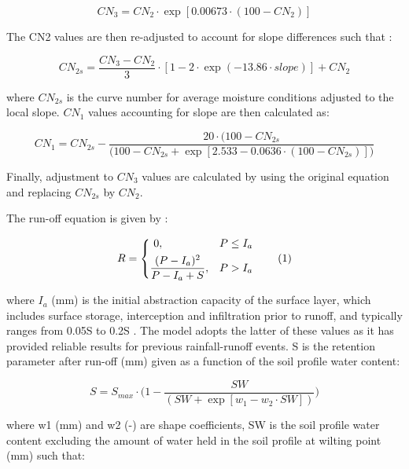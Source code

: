 \documentclass[]{article}
\begin{document}
\begin{equation}  
CN_3 = CN_2 \cdot \exp [0.00673 \cdot (100-CN_2)] 
\label{eq:CN3}  
\end{equation}

The CN2 values are then re-adjusted to account for slope differences
such that \citep{Neitsch2009}:

\begin{equation}  
CN_{2s} = \frac{CN_3 - CN_2}{3} \cdot [1-2 \cdot \exp (-13.86 \cdot slope)] + CN_2 
\label{eq:CN2s}  
\end{equation}

where \(CN_{2s}\) is the curve number for average moisture conditions
adjusted to the local slope. \(CN_1\) values accounting for slope are
then calculated as:

\begin{equation}  
CN_{1} = CN_{2s} - \frac{20 \cdot (100 - CN_{2s}}{\Big(100 - CN_{2s} + \exp [2.533-0.0636 \cdot (100 - CN_{2s})]\Big)} 
\label{eq:CN1}  
\end{equation}

Finally, adjustment to \(CN_3\) values are calculated by using the
original equation and replacing \(CN_{2s}\) by \(CN_2\).

The run-off equation is given by \citep{Neitsch2009}:

\[
    R = 
\begin{dcases}
     ~0,                                     & P \leq I_a \\
    \frac{(P-I_a)^2}{P-I_a+S},              & P > I_a 
\end{dcases}
\stepcounter{equation}\tag{\theequation}\label{eq:R}
\]

where \(I_a\) (mm) is the initial abstraction capacity of the surface
layer, which includes surface storage, interception and infiltration
prior to runoff, and typically ranges from 0.05S to 0.2S
\citep{Lim2006}. The model adopts the latter of these values as it has
provided reliable results for previous rainfall-runoff events. S is the
retention parameter after run-off (mm) given as a function of the soil
profile water content:

\begin{equation}
S = S_{max} \cdot \Big(1-\frac{SW}{(SW+ \exp[w_1-w_2 \cdot SW]  )} \Big) 
\label{eq:S}  
\end{equation}

where w1 (mm) and w2 (-) are shape coefficients, SW is the soil profile
water content excluding the amount of water held in the soil profile at
wilting point (mm) such that:
\end{document}
